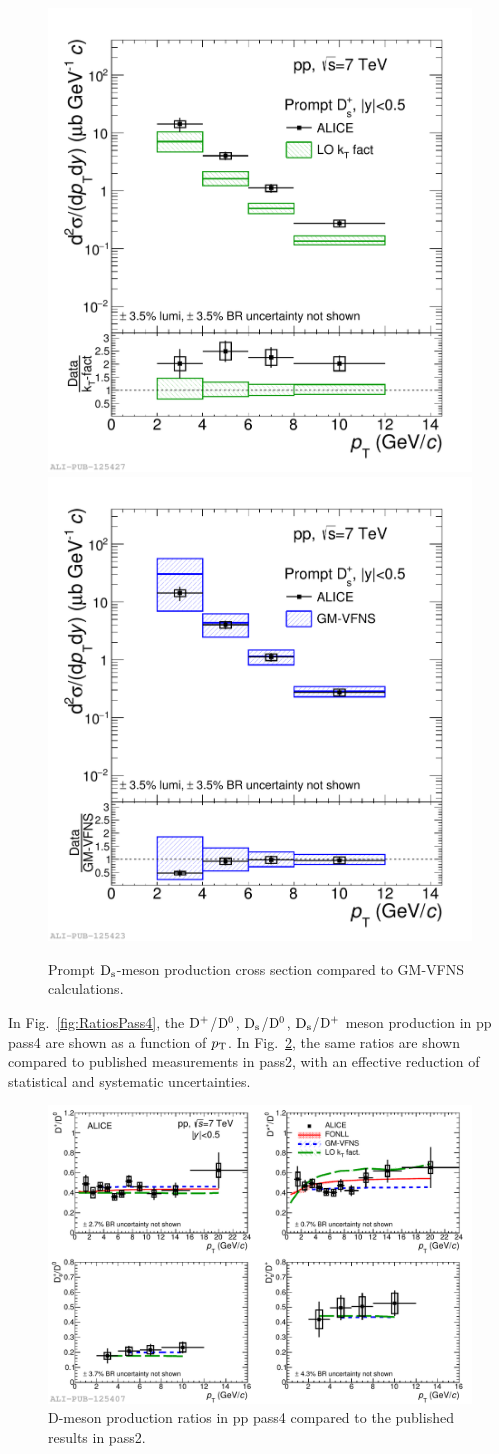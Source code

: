 \begin{figure}[!htb]
\begin{center}
\includegraphics[width=.48\textwidth]{FigCap4/DsppCrossSecVsKtFactAndRatio.pdf}
\includegraphics[width=.48\textwidth]{FigCap4/DsppCrossSecVsGMVFNSAndRatio.pdf}
\caption{Prompt ${\rm D_s}$-meson production cross section compared
to GM-VFNS calculations.}
\label{fig:CrossSecDsvsGMVFNS}
\end{center}
\end{figure}


In Fig.~\ref{fig:RatiosPass4}, the
 ${\rm D^+}$/${\rm D^0}$, ${\rm D_s}$/${\rm D^0}$, ${\rm D_s}$/${\rm D^+}$ 
 meson production in pp pass4 are shown
as a function of $p_{\rm T}$.
In Fig.~\ref{fig:RatiosPass2Pass4}, the same ratios are 
shown compared to published measurements in pass2, with an effective reduction of 
statistical and systematic uncertainties. 

\begin{figure}[!htb]
\begin{center}
\includegraphics[width=1\textwidth]{FigCap4/DmesonRatiosVsModels.pdf}
\caption{D-meson production ratios in pp pass4 compared to the published results in pass2.}
\label{fig:RatiosPass2Pass4}
\end{center}
\end{figure}


